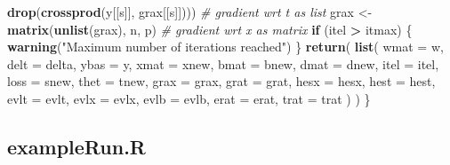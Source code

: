 \documentclass[
  12pt,
]{article}
\newenvironment{Shaded}{\begin{snugshade}}{\end{snugshade}}
\newcommand{\AttributeTok}[1]{\textcolor[rgb]{0.13,0.29,0.53}{#1}}
\newcommand{\CommentTok}[1]{\textcolor[rgb]{0.56,0.35,0.01}{\textit{#1}}}
\newcommand{\ControlFlowTok}[1]{\textcolor[rgb]{0.13,0.29,0.53}{\textbf{#1}}}
\newcommand{\FunctionTok}[1]{\textcolor[rgb]{0.13,0.29,0.53}{\textbf{#1}}}
\newcommand{\NormalTok}[1]{#1}
\newcommand{\OtherTok}[1]{\textcolor[rgb]{0.56,0.35,0.01}{#1}}
\newcommand{\SpecialCharTok}[1]{\textcolor[rgb]{0.81,0.36,0.00}{\textbf{#1}}}
\newcommand{\StringTok}[1]{\textcolor[rgb]{0.31,0.60,0.02}{#1}}
\begin{document}
\begin{Shaded}
\begin{Highlighting}[]
        \FunctionTok{drop}\NormalTok{(}\FunctionTok{crossprod}\NormalTok{(y[[s]], grax[[s]]))) }\CommentTok{\# gradient wrt t as list}
\NormalTok{    grax }\OtherTok{\textless{}{-}} \FunctionTok{matrix}\NormalTok{(}\FunctionTok{unlist}\NormalTok{(grax), n, p) }\CommentTok{\# gradient wrt x as matrix}
    \ControlFlowTok{if}\NormalTok{ (itel }\SpecialCharTok{\textgreater{}}\NormalTok{ itmax) \{}
      \FunctionTok{warning}\NormalTok{(}\StringTok{"Maximum number of iterations reached"}\NormalTok{)}
\NormalTok{    \}}
    \FunctionTok{return}\NormalTok{(}
      \FunctionTok{list}\NormalTok{(}
        \AttributeTok{wmat =}\NormalTok{ w,}
        \AttributeTok{delt =}\NormalTok{ delta,}
        \AttributeTok{ybas =}\NormalTok{ y,}
        \AttributeTok{xmat =}\NormalTok{ xnew,}
        \AttributeTok{bmat =}\NormalTok{ bnew,}
        \AttributeTok{dmat =}\NormalTok{ dnew,}
        \AttributeTok{itel =}\NormalTok{ itel,}
        \AttributeTok{loss =}\NormalTok{ snew,}
        \AttributeTok{thet =}\NormalTok{ tnew,}
        \AttributeTok{grax =}\NormalTok{ grax,}
        \AttributeTok{grat =}\NormalTok{ grat,}
        \AttributeTok{hesx =}\NormalTok{ hesx,}
        \AttributeTok{hest =}\NormalTok{ hest,}
        \AttributeTok{evlt =}\NormalTok{ evlt,}
        \AttributeTok{evlx =}\NormalTok{ evlx,}
        \AttributeTok{evlb =}\NormalTok{ evlb,}
        \AttributeTok{erat =}\NormalTok{ erat,}
        \AttributeTok{trat =}\NormalTok{ trat}
\NormalTok{      )}
\NormalTok{    )}
\NormalTok{  \}}
\end{Highlighting}
\end{Shaded}

\subsection{exampleRun.R}\label{examplerun.r}
\end{document}
